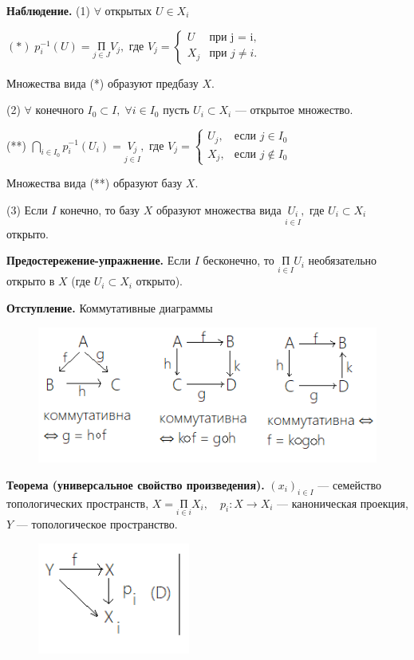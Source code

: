 \documentclass[12pt,a4paper]{article}
\begin{document}
\textbf{Наблюдение.} (1) $\forall$ открытых $U \in X_{i}$ 

$(*) \; p_{i}^{-1}(U) = \underset{j \in J}{\text{П}} V_{j},$ где $V_{j} = 
\begin{cases}
U &\text{при j = i,}\\
X_{j} &\text{при $j \neq i.$}
\end{cases}$

Множества вида (*) образуют предбазу $X.$ 

(2) $\forall$ конечного $I_{0} \subset I, \; \forall i \in I_{0}$ пусть $U_{i} \subset X_{i}$ --- открытое множество. 

(**) $\underset{i \in I_{0}}{\bigcap} p_{i}^{-1}(U_{i}) = \underset{j \in I}{V_{j}},$ где $V_{j} = 
\begin{cases}
U_{j}, &\text{если $j \in I_{0}$}\\
X_{j}, &\text{если $j \not \in I_{0}$}
\end{cases}$

Множества вида (**) образуют базу $X.$ 

(3) Если $I$ конечно, то базу $X$ образуют множества вида $\underset{i \in I}{U_{i}},$ где $U_{i} \subset X_{i}$ открыто. 

\textbf{Предостережение-упражнение.} Если $I$ бесконечно, то $\underset{i \in I}{\text{П}}U_{i}$ необязательно открыто в $X$ (где $U_{i} \subset X_{i}$ открыто).

\textbf{Отступление.} Коммутативные диаграммы 

\begin{figure}[htpb]
	\centering
	\includegraphics[width=0.8\linewidth]{lect6_1.png}
\end{figure}

\textbf{Теорема (универсальное свойство произведения).} $(x_{i})_{i \in I}$ --- семейство топологических пространств, $X = \underset{i \in i}{\text{П}} X_{i}, \quad p_{i}: X \to X_{i}$ --- каноническая проекция, $Y$ --- топологическое пространство. 

\begin{figure}
	\includegraphics[width = 5cm]{lect6_2.png}
\end{figure}
\end{document}
